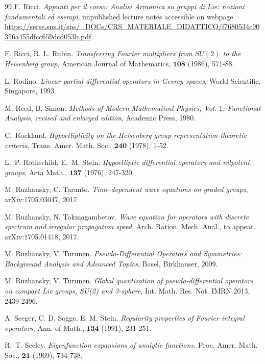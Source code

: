 \documentclass[12pt,oneside,a4paper]{book}
\numberwithin{equation}{section}     %
\theoremstyle{plain}
\theoremstyle{definition}
\begin{document}
\begin{thebibliography}{99}
	F. Ricci.
	\newblock \emph{Appunti per il corso: Analisi Armonica su gruppi di Lie: nozioni fondamentali ed esempi},
	unpublished lecture notes accessible on webpage \url{https://serse.sns.it/sns/_DOCs/CRS_MATERIALE_DIDATTICO/f7680534c90356a455dfcc659dcd053b.pdf}.
	
	F. Ricci, R. L. Rubin.
	\emph{Transferring Fourier multipliers from $SU(2)$ to the Heisenberg group},
	American Journal of Mathematics, $\mathbf{108}$ (1986), 571-88.
	
	L. Rodino.
	\emph{Linear partial differential operators in Gevrey spaces},
	World Scientific, Singapore, 1993.
	
	M. Reed, B. Simon.
	\emph{Methods of Modern Mathematical Physics, Vol. $1$: Functional Analysis, revised and enlarged edition},
	Academic Press, 1980.
	
	C.~Rockland.
	\emph{Hypoellipticity on the {H}eisenberg group-representation-theoretic criteria},
	Trans. Amer. Math. Soc., $\mathbf{240}$ (1978), 1-52.
	
	L.~P. Rothschild, E.~M. Stein.
	\emph{Hypoelliptic differential operators and nilpotent groups},
	Acta Math., $\mathbf{137}$ (1976), 247-320.
	
	M. Ruzhansky, C. Taranto.
	\emph{Time-dependent wave equations on graded groups},
	arXiv:1705.03047, 2017.
	
	M. Ruzhansky, N. Tokmagambetov.
	\emph{Wave equation for operators with discrete spectrum and irregular propagation speed},
	Arch. Ration. Mech. Anal., to appear. arXiv:1705.01418, 2017.
	
	
	M. Ruzhansky, V. Turunen.
	\emph{Pseudo-Differential Operators and Symmetries: Background Analysis and Advanced Topics},
	Basel, Birkhauser,
	2009.
	
	M. Ruzhansky, V. Turunen.
	\emph{Global quantization of pseudo-differential operators on compact Lie groups, SU(2) and 3-sphere}, Int. Math. Res. Not. IMRN 2013, 2439-2496.
	
	A. Seeger, C. D. Sogge, E. M. Stein.
	\emph{Regularity properties of Fourier integral operators},
	Ann. of Math., $\mathbf{134}$ (1991), 231-251.
	
	R.~T. Seeley.
	\emph{Eigenfunction expansions of analytic functions.}
	Proc. Amer. Math. Soc., $\mathbf{21}$ (1969), 734-738.
	

\end{thebibliography}
\end{document}
